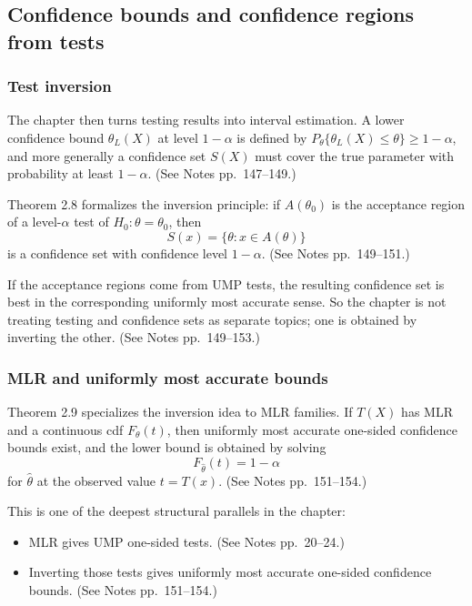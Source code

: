 \subsection{Confidence bounds and confidence regions from tests}
\subsubsection{Test inversion}
The chapter then turns testing results into interval estimation. A lower confidence bound $\theta_L(X)$ at level $1-\alpha$ is defined by $P_\theta\{\theta_L(X) \le \theta\} \ge 1-\alpha$, and more generally a confidence set $S(X)$ must cover the true parameter with probability at least $1-\alpha$. (See Notes pp.~147--149.)

Theorem 2.8 formalizes the inversion principle: if $A(\theta_0)$ is the acceptance region of a level-$\alpha$ test of $H_0:\theta=\theta_0$, then
\[
S(x)=\{\theta: x \in A(\theta)\}
\]
is a confidence set with confidence level $1-\alpha$. (See Notes pp.~149--151.)

If the acceptance regions come from UMP tests, the resulting confidence set is best in the corresponding uniformly most accurate sense. So the chapter is not treating testing and confidence sets as separate topics; one is obtained by inverting the other. (See Notes pp.~149--153.)

\subsubsection{MLR and uniformly most accurate bounds}
Theorem 2.9 specializes the inversion idea to MLR families. If $T(X)$ has MLR and a continuous cdf $F_\theta(t)$, then uniformly most accurate one-sided confidence bounds exist, and the lower bound is obtained by solving
\[
F_{\hat\theta}(t)=1-\alpha
\]
for $\hat\theta$ at the observed value $t=T(x)$. (See Notes pp.~151--154.)

This is one of the deepest structural parallels in the chapter:
\begin{itemize}
    \item MLR gives UMP one-sided tests. (See Notes pp.~20--24.)
    \item Inverting those tests gives uniformly most accurate one-sided confidence bounds. (See Notes pp.~151--154.)
\end{itemize}

